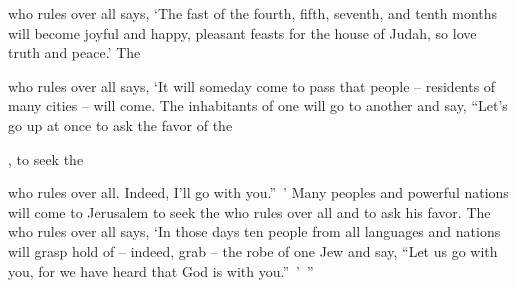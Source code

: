 {{}
who rules over all
says,
‘The fast
of the fourth,
fifth,
seventh,
and tenth
months will become
joyful
and happy,
pleasant
feasts
for the house
of Judah,
so love
truth
and peace.’
The

{}
who rules over all
says, ‘It will someday
come
to pass that people
– residents
of many
cities – will come.
The inhabitants
of one
will go
to
another
and say,
“Let’s
go
up at once to ask the favor
of the

{}, to seek
the

{}
who rules over all.
Indeed,
I’ll
go with you.” ’
Many
peoples
and powerful
nations
will come
to Jerusalem
to seek
the {}
who rules over all
and to ask his favor.
The
{}
who rules over all
says,
‘In those
days
ten
people
from all
languages
and nations
will grasp hold of – indeed, grab – the robe of one Jew and say, “Let us go with you, for we have heard that God is with you.” ’ ”

}
